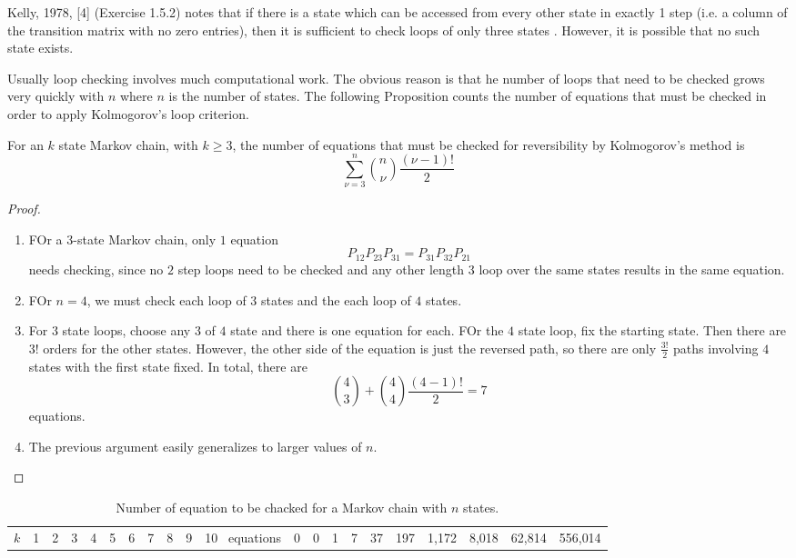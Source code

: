 \documentclass[12pt]{article}
\begin{document}
Kelly, 1978, [4] (Exercise 1.5.2) notes that
if there is a state which can be accessed from every other state in exactly 1 step
(i.e. a column of the transition matrix with no zero entries), then it is sufficient to
check loops of only three states . However, it is possible that no
such state exists.

Usually loop checking involves much computational work.  The obvious
reason is that he number of loops that need
to be checked grows very quickly with $n$ where $n$ is the number of states. 
The following Proposition counts the number of equations that must be checked in order to
apply Kolmogorov’s loop criterion.

\begin{proposition}
For an $k$ state Markov chain, with $k \ge 3$, the number of
equations that must be checked for reversibility by Kolmogorov’s method is
\[
  \sum_{\nu=3}^n \binom{n}{\nu} \frac{(\nu-1)!}{2}
\]
\end{proposition}

\begin{proof}
  \begin{enumerate}
  \item FOr a $3$-state Markov chain, only $1$ equation
    \[
      P_{12}P_{23}P_{31} = P_{31} P_{32} P_{21}
    \]
    needs checking, since no $2$ step loops need to be checked and any
    other length $3$ loop over the same states results in the same
    equation.
  \item FOr $n=4$, we must check each loop of $3$ states and the each
    loop of $4$ states.
  \item For $3$ state loops, choose any $3$ of $4$ state and there is
    one equation for each.  FOr the $4$ state loop, fix the starting
    state.  Then there are $3!$ orders for the other states.  However,
     the other side of the equation is just the reversed path, so
     there are only $\frac{3!}{2}$ paths involving $4$ states with the
     first state fixed.  In total, there are
     \[
       \binom{4}{3} + \binom{4}{4} \frac{(4-1)!}{2} = 7
     \]
     equations.
   \item The previous argument easily generalizes to larger values of $n$.
  \end{enumerate}
\end{proof}

\begin{table}
  \centering
  \begin{tabular}{ccccccccccc}
    $k$& 1&2 &3 &4 &5 &6 & 7 & 8 & 9 & 10 \
    equations & 0 & 0 & 1 & 7 & 37 & 197 & 1{,}172 & 8{,}018 & 62{,}814 & 556{,}014
  \end{tabular}
  \caption{Number of equation to be chacked for a Markov chain with
    $n$ states.}
  \label{tab:reversiblemarkovchains:loopeqns}
\end{table}
\end{document}
